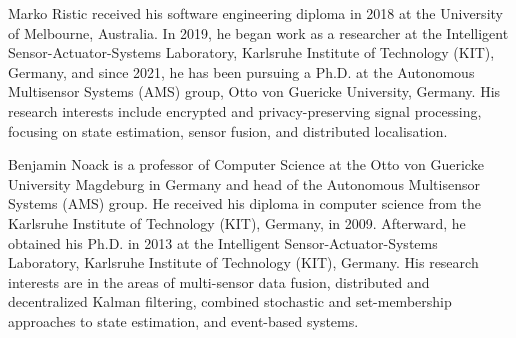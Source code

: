 \documentclass[10pt,letterpaper,oneside,twocolumn,journal]{IEEEtran}
\theoremstyle{definition}
\theoremstyle{definition}
\theoremstyle{remark}
\begin{document}
\ifCLASSOPTIONcaptionsoff
  \newpage
\fi





% 
%                                         
%                                         
%                                         
% 

\vspace{-2\baselineskip}
\begin{IEEEbiography}{Marko Ristic}
received his software engineering diploma in 2018 at the University of Melbourne, Australia. In 2019, he began work as a researcher at the Intelligent Sensor-Actuator-Systems Laboratory, Karlsruhe Institute of Technology (KIT), Germany, and since 2021, he has been pursuing a Ph.D. at the Autonomous Multisensor Systems (AMS) group, Otto von Guericke University, Germany. His research interests include encrypted and privacy-preserving signal processing, focusing on state estimation, sensor fusion, and distributed localisation.
\end{IEEEbiography}

\vspace{-2\baselineskip}
\begin{IEEEbiography}{Benjamin Noack}
is a professor of Computer Science at the Otto von Guericke University Magdeburg in Germany and head of the Autonomous Multisensor Systems (AMS) group. He received his diploma in computer science from the Karlsruhe Institute of Technology (KIT), Germany, in 2009. Afterward, he obtained his Ph.D. in 2013 at the Intelligent Sensor-Actuator-Systems Laboratory, Karlsruhe Institute of Technology (KIT), Germany. His research interests are in the areas of multi-sensor data fusion, distributed and decentralized Kalman filtering, combined stochastic and set-membership approaches to state estimation, and event-based systems.
\end{IEEEbiography}
\end{document}
